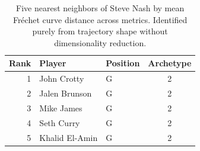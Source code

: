\begin{table}[htbp]
  \centering\small
  \begin{tabular}{rllc}
    \toprule
    Rank & Player & Position & Archetype \\
    \midrule
    1 & John Crotty & G & 2 \\
    2 & Jalen Brunson & G & 2 \\
    3 & Mike James & G & 2 \\
    4 & Seth Curry & G & 2 \\
    5 & Khalid El-Amin & G & 2 \\
    \bottomrule
  \end{tabular}
  \caption{Five nearest neighbors of Steve Nash by mean Fr\'{e}chet curve distance across metrics. Identified purely from trajectory shape without dimensionality reduction.}
  \label{tab:Steve_Nash_frechet_curve_neighbors}
\end{table}

